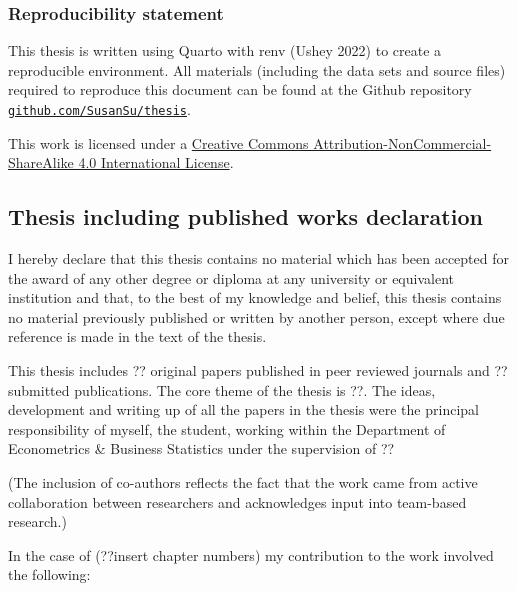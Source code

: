 \documentclass[
  11pt,
  a4paper,
  nottoc]{report}
\begin{document}
\subsubsection*{Reproducibility
statement}\label{reproducibility-statement}

This thesis is written using Quarto with renv (Ushey 2022) to create a
reproducible environment. All materials (including the data sets and
source files) required to reproduce this document can be found at the
Github repository
\href{https://github.com/SusanSu/thesis}{\texttt{github.com/SusanSu/thesis}}.

This work is licensed under a
\href{http://creativecommons.org/licenses/by-nc-sa/4.0/}{Creative
Commons Attribution-NonCommercial-ShareAlike 4.0 International License}.

\subsection*{Thesis including published works
declaration}\label{thesis-including-published-works-declaration}

I hereby declare that this thesis contains no material which has been
accepted for the award of any other degree or diploma at any university
or equivalent institution and that, to the best of my knowledge and
belief, this thesis contains no material previously published or written
by another person, except where due reference is made in the text of the
thesis.

This thesis includes ?? original papers published in peer reviewed
journals and ?? submitted publications. The core theme of the thesis is
??. The ideas, development and writing up of all the papers in the
thesis were the principal responsibility of myself, the student, working
within the Department of Econometrics \& Business Statistics under the
supervision of ??

(The inclusion of co-authors reflects the fact that the work came from
active collaboration between researchers and acknowledges input into
team-based research.)

In the case of (??insert chapter numbers) my contribution to the work
involved the following:

\begingroup\fontsize{10}{12}\selectfont
\end{document}
